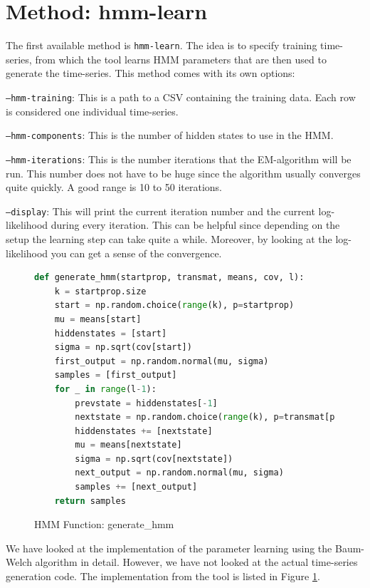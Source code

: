 \section{Method: hmm-learn}

The first available method is \texttt{hmm-learn}. The idea is to specify training time-series, from which the tool learns HMM parameters that are then used to generate the time-series. This method comes with its own options:

\texttt{---hmm-training}: This is a path to a CSV containing the training data. Each row is considered one individual time-series. 

\texttt{---hmm-components}: This is the number of hidden states to use in the HMM. 

\texttt{---hmm-iterations}: This is the number iterations that the EM-algorithm will be run. This number does not have to be huge since the algorithm usually converges quite quickly. A good range is 10 to 50 iterations.

\texttt{---display}: This will print the current iteration number and the current log-likelihood during every iteration. This can be helpful since depending on the setup the learning step can take quite a while. Moreover, by looking at the log-likelihood you can get a sense of the convergence. 

\begin{figure}
\begin{singlespace}
\begin{lstlisting}[language=Python]
def generate_hmm(startprop, transmat, means, cov, l):
    k = startprop.size
    start = np.random.choice(range(k), p=startprop)
    mu = means[start]
    hiddenstates = [start]
    sigma = np.sqrt(cov[start])
    first_output = np.random.normal(mu, sigma)
    samples = [first_output]
    for _ in range(l-1):
        prevstate = hiddenstates[-1]
        nextstate = np.random.choice(range(k), p=transmat[prevstate])
        hiddenstates += [nextstate]
        mu = means[nextstate]
        sigma = np.sqrt(cov[nextstate])
        next_output = np.random.normal(mu, sigma)
        samples += [next_output]
    return samples
\end{lstlisting}
\end{singlespace}
\caption{HMM Function: generate\_hmm}    
\label{fig:hmm-generate}
\end{figure}

We have looked at the implementation of the parameter learning using the Baum-Welch algorithm in detail. However, we have not looked at the actual time-series generation code. The implementation from the tool is listed in Figure \ref{fig:hmm-generate}. 

